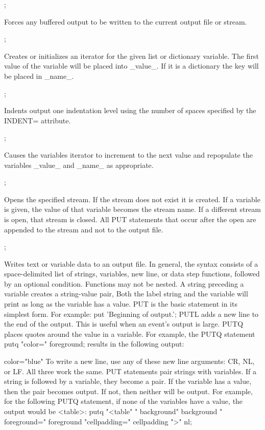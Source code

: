 \begin{description}
;

Forces any buffered output to be written to the current output file or stream.

;

Creates or initializes an iterator for the given list or dictionary variable. The first value of the variable will be placed into \_value\_. If it is a dictionary the key will be placed in \_name\_.

;

Indents output one indentation level using the number of spaces specified by the INDENT= attribute. 

;

Causes the variables iterator to increment to the next value and repopulate the variables \_value\_ and \_name\_ as appropriate.

;

Opens the specified stream. If the stream does not exist it is created. If a variable is given, the value of that variable becomes the stream name.  If a different stream is open, that stream is closed. All PUT statements that occur after the open are appended to the stream and not to the output file.

;

Writes text or variable data to an output file. In general, the syntax consists of a space-delimited list of strings, variables, new line, or data step functions, followed by an optional condition. Functions may not be nested. A string preceding a variable creates a string-value pair, Both the label string and the variable will print as long as the variable has a value.
PUT is the basic statement in its simplest form. For example:
    put 'Beginning of output.';
PUTL adds a new line to the end of the output. This is useful when an event's output is large.
PUTQ places quotes around the value in a variable. For example, the PUTQ statement
    putq "color=" foreground;
results in the following output: 

color="blue"
To write a new line, use any of these new line arguments: CR, NL, or LF. All three work the same.
PUT statements pair strings with variables. If a string is followed by a variable, they become a pair. If the variable has a value, then the pair becomes output. If not, then neither will be output. For example, for the following PUTQ statement, if none of the variables have a value, the output would be <table>:
    putq "<table" " background" background "
    foreground=" foreground "cellpadding=" cellpadding ">" nl;


\end{description}

